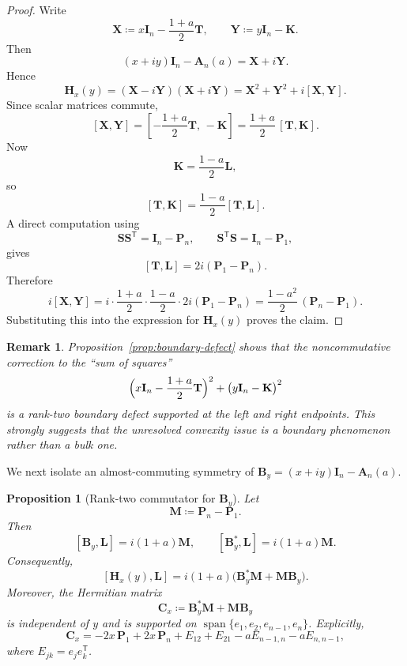 \documentclass[11pt]{article}
\newtheorem{proposition}[theorem]{Proposition}
\newtheorem{remark}[theorem]{Remark}
\begin{document}
\begin{proof}
Write
\[
\mathbf X\coloneqq x\mathbf I_n-\frac{1+a}{2}\mathbf T,
\qquad
\mathbf Y\coloneqq y\mathbf I_n-\mathbf K.
\]
Then
\[
(x+iy)\mathbf I_n-\mathbf A_n(a)=\mathbf X+i\mathbf Y.
\]
Hence
\[
\mathbf H_x(y)
=
(\mathbf X-i\mathbf Y)(\mathbf X+i\mathbf Y)
=
\mathbf X^2+\mathbf Y^2+i[\mathbf X,\mathbf Y].
\]
Since scalar matrices commute,
\[
[\mathbf X,\mathbf Y]
=
\left[-\frac{1+a}{2}\mathbf T,\,-\mathbf K\right]
=
\frac{1+a}{2}\,[\mathbf T,\mathbf K].
\]
Now
\[
\mathbf K=\frac{1-a}{2}\mathbf L,
\]
so
\[
[\mathbf T,\mathbf K]=\frac{1-a}{2}[\mathbf T,\mathbf L].
\]
A direct computation using
\[
\mathbf S\mathbf S^{\mathsf T}=\mathbf I_n-\mathbf P_n,
\qquad
\mathbf S^{\mathsf T}\mathbf S=\mathbf I_n-\mathbf P_1,
\]
gives
\[
[\mathbf T,\mathbf L]
=
2i(\mathbf P_1-\mathbf P_n).
\]
Therefore
\[
i[\mathbf X,\mathbf Y]
=
i\cdot \frac{1+a}{2}\cdot \frac{1-a}{2}\cdot 2i(\mathbf P_1-\mathbf P_n)
=
\frac{1-a^2}{2}\,(\mathbf P_n-\mathbf P_1).
\]
Substituting this into the expression for \(\mathbf H_x(y)\) proves the claim.
\end{proof}

\begin{remark}
Proposition~\ref{prop:boundary-defect} shows that the noncommutative correction to the ``sum of squares''
\[
\Bigl(x\mathbf I_n-\frac{1+a}{2}\mathbf T\Bigr)^2
+
\bigl(y\mathbf I_n-\mathbf K\bigr)^2
\]
is a rank-two boundary defect supported at the left and right endpoints. This strongly suggests that the unresolved convexity issue is a boundary phenomenon rather than a bulk one.
\end{remark}

We next isolate an almost-commuting symmetry of \(\mathbf B_y=(x+iy)\mathbf I_n-\mathbf A_n(a)\).

\begin{proposition}[Rank-two commutator for \(\mathbf B_y\)]\label{prop:B-commutator}
Let
\[
\mathbf M\coloneqq \mathbf P_n-\mathbf P_1.
\]
Then
\[
[\mathbf B_y,\mathbf L]=i(1+a)\mathbf M,
\qquad
[\mathbf B_y^*,\mathbf L]=i(1+a)\mathbf M.
\]
Consequently,
\[
[\mathbf H_x(y),\mathbf L]
=
i(1+a)\bigl(\mathbf B_y^*\mathbf M+\mathbf M\mathbf B_y\bigr).
\]
Moreover, the Hermitian matrix
\[
\mathbf C_x\coloneqq \mathbf B_y^*\mathbf M+\mathbf M\mathbf B_y
\]
is independent of \(y\) and is supported on \(\operatorname{span}\{e_1,e_2,e_{n-1},e_n\}\). Explicitly,
\[
\mathbf C_x
=
-2x\,\mathbf P_1
+2x\,\mathbf P_n
+E_{12}+E_{21}
-aE_{n-1,n}
-aE_{n,n-1},
\]
where \(E_{jk}=e_je_k^{\mathsf T}\).
\end{proposition}
\end{document}
